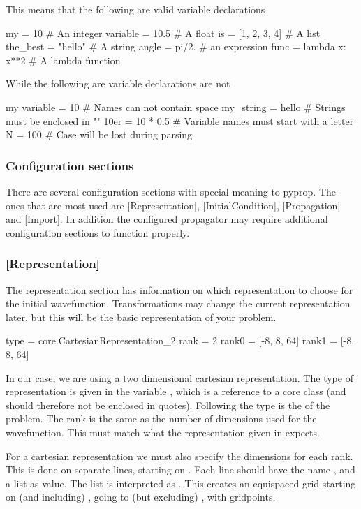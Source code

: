 \noindent This means that the following are valid variable declarations
\begin{python}
	my = 10               # An integer
	variable = 10.5       # A float
	is = [1, 2, 3, 4]     # A list
	the_best = "hello"    # A string
	angle = pi/2.         # an expression
	func = lambda x: x**2 # A lambda function
\end{python}
While the following are variable declarations are not
\begin{python}
	my variable = 10      # Names can not contain space
	my_string = hello     # Strings must be enclosed in ""
	10er = 10 * 0.5       # Variable names must start with a letter
	N = 100               # Case will be lost during parsing
\end{python}

\subsubsection*{Configuration sections}
There are several configuration sections with special meaning to pyprop. The ones that are most used are [Representation], 
[InitialCondition], [Propagation] and [Import]. In addition the configured propagator may require additional 
configuration sections to function properly.

\subsubsection*{[Representation]}
The representation section has information on which representation to choose for the initial wavefunction. Transformations
may change the current representation later, but this will be the basic representation of your problem. 
\begin{python}
	[Representation]
	type = core.CartesianRepresentation_2
	rank = 2
	rank0 = [-8, 8, 64]
	rank1 = [-8, 8, 64]
\end{python}
In our case, we are
using a two dimensional cartesian representation. The type of representation is given in the variable , which
is a reference to a core class (and should therefore not be enclosed in quotes). Following the type is the  
of the problem. The rank is the same as the number of dimensions used for the wavefunction. 
This must match what the representation given in  expects.

For a cartesian representation we must also specify the dimensions for each rank. This is done on separate lines, 
starting on . Each line should have the name , and a list as value. The list is
interpreted as . This creates an equispaced grid starting on (and including) ,
going to (but excluding) , with  gridpoints.

